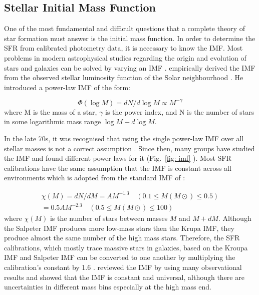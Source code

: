 \subsection{Stellar Initial Mass Function}
\label{sec: imf}
One of the most fundamental and difficult questions that a complete theory of star formation must answer is the initial mass function. In order to determine the SFR from calibrated photometry data, it is necessary to know the IMF. Most problems in modern astrophysical studies regarding the origin and evolution of stars and galaxies can be solved by varying an IMF \citep{Bastin10}. \cite{Salpeter55} empirically derived the IMF from the observed stellar luminosity function of the Solar neighbourhood \citep{Shu87}. He introduced a power-law IMF of the form:

\begin{equation}
\label{equ: salp}
\Phi (\log M) = dN / d \log M \propto M^{-\gamma }
\end{equation} 
where M is the mass of a star, $\gamma$ is the power index, and N is the number of stars in some logarithmic mass range $\log M + d\log M$. 

In the late 70s, it was recognised that using the single power-law IMF over all stellar masses is not a correct assumption \citep{Kroupa93, Bastin10}. Since then, many groups have studied the IMF and found different power laws for it (Fig.{~\ref{fig: imf}} ). Most SFR calibrations have the same assumption that the IMF is constant across all environments which is adopted from the standard IMF of \cite{Kroupa01}:

\begin{align}
\chi (M) = dN/dM = A M^{-1.3}    \quad    (0.1 \le M(M{\odot}) \le 0.5)\\                  
           = 0.5 A M^{-2.3}    \quad    (0.5 \le M(M{\odot}) \le 100)
\end{align}
where $\chi(M)$ is the number of stars between masses $M$ and $M+dM$. Although the Salpeter IMF produces more low-mass stars then the Krupa IMF, they produce almost the same number of the high mass stars. Therefore, the SFR calibrations, which mostly trace massive stars in galaxies, based on the Kroupa IMF and Salpeter IMF can be converted to one another by multiplying the calibration's constant by 1.6 \citep{Calzetti13}. \cite{Bastin10} reviewed  the IMF  by using many observational results and showed that the IMF is constant and universal, although there are uncertainties in different mass bins especially at the high mass end.

